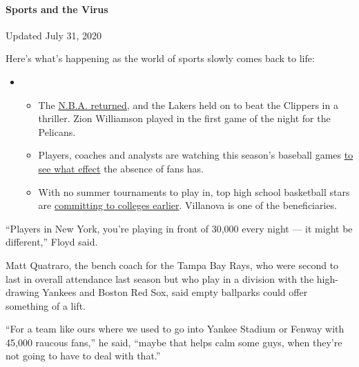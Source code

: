 \hypertarget{sports-and-the-virus}{%
\paragraph{Sports and the Virus}\label{sports-and-the-virus}}

Updated July 31, 2020

Here's what's happening as the world of sports slowly comes back to
life:

\begin{itemize}
\item
  \begin{itemize}
  \tightlist
  \item
    The
    \href{https://www.nytimes.com/2020/07/30/sports/basketball/clippers-lakers.html?action=click\&pgtype=Article\&state=default\&region=MAIN_CONTENT_2\&context=storylines_keepup}{N.B.A.
    returned}, and the Lakers held on to beat the Clippers in a
    thriller. Zion Williamson played in the first game of the night for
    the Pelicans.
  \item
    Players, coaches and analysts are watching this season's baseball
    games
    \href{https://www.nytimes.com/2020/07/31/sports/baseball/baseball-empty-stadiums-effects.html?action=click\&pgtype=Article\&state=default\&region=MAIN_CONTENT_2\&context=storylines_keepup}{to
    see what effect} the absence of fans has.
  \item
    With no summer tournaments to play in, top high school basketball
    stars are
    \href{https://www.nytimes.com/2020/07/30/sports/ncaabasketball/college-basketball-recruiting.html?action=click\&pgtype=Article\&state=default\&region=MAIN_CONTENT_2\&context=storylines_keepup}{committing
    to colleges earlier}. Villanova is one of the beneficiaries.
  \end{itemize}
\end{itemize}

``Players in New York, you're playing in front of 30,000 every night ---
it might be different,'' Floyd said.

Matt Quatraro, the bench coach for the Tampa Bay Rays, who were second
to last in overall attendance last season but who play in a division
with the high-drawing Yankees and Boston Red Sox, said empty ballparks
could offer something of a lift.

``For a team like ours where we used to go into Yankee Stadium or Fenway
with 45,000 raucous fans,'' he said, ``maybe that helps calm some guys,
when they're not going to have to deal with that.''

